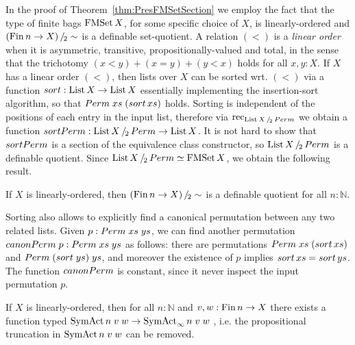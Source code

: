 \documentclass[a4paper,USenglish,cleveref]{lipics-v2021}
\begin{document}
In the proof of Theorem~\ref{thm:PresFMSetSection} we employ the fact that the type of finite bags $\FMSet X$, for some specific choice of $X$, is linearly-ordered and $\SetQuot[(\Fin n \to X)][\sim]$ is a definable set-quotient.
A relation $(<)$ is a \emph{linear order} when it is asymmetric, transitive, propositionally-valued and total, in the sense that the trichotomy $(x < y) + (x = y) + (y < x)$ holds for all $x,y:X$.
If $X$ has a linear order $(<)$, then lists over $X$ can be sorted wrt. $(<)$ via a function $\sort : \List X \to \List X$ essentially implementing the insertion-sort algorithm, so that $\Perm \;xs\;(\sort\,xs)$ holds. Sorting is independent of the positions of each entry in the input list, therefore via $\Rec{\SetQuot[\List X][\Perm]}$ we obtain a function $\sortPerm : \SetQuot[\List X][\Perm] \to \List X$. It is not hard to show that $\sortPerm$ is a section of the equivalence class constructor, so $\SetQuot[\List X][\Perm]$ is a definable quotient.
Since $\SetQuot[\List X][\Perm] \simeq \FMSet X$, we obtain the following result.
\begin{proposition}\label{prop:ListPermDefQuot}
If $X$ is linearly-ordered, then $\SetQuot[(\Fin n \to X)][\sim]$ is a definable quotient for all $n : ℕ$.
\end{proposition}

Sorting also allows to explicitly find a canonical permutation between any two related lists. Given $p : \Perm \;xs\;ys$, we can find another permutation $\canonicalPerm \;p : \Perm\;xs\;ys$ as follows: there are permutations $\Perm\;xs\;(\sort\,xs)$ and $\Perm\;(\sort\;ys)\;ys$, and moreover the existence of $p$ implies $\sort\,xs = \sort\,ys$. The function $\canonicalPerm$ is constant, since it never inspect the input permutation $p$. 
\begin{proposition}\label{prop:ListPermCanonicalPerm}
If $X$ is linearly-ordered, then for all $n : ℕ$ and $v,w : \Fin n \to X$ there exists a function typed $\SymAct n\; v\; w \to \SymActSigma n \;v \; w$ , i.e. the propositional truncation in $\SymAct n\; v\; w$ can be removed.
\end{proposition}
\end{document}

